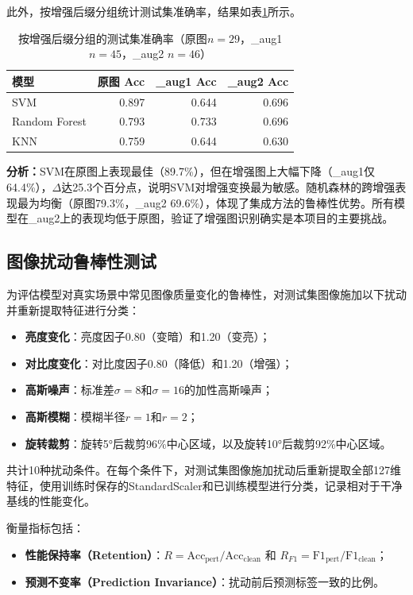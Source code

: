 \documentclass[UTF8,a4paper,12pt]{ctexart}
\numberwithin{figure}{section}
\numberwithin{table}{section}
\begin{document}
此外，按增强后缀分组统计测试集准确率，结果如表\ref{tab:aug_suffix}所示。

\begin{table}[H]
\centering
\caption{按增强后缀分组的测试集准确率（原图$n=29$，\_aug1 $n=45$，\_aug2 $n=46$）}
\label{tab:aug_suffix}
\begin{tabular}{lrrr}
\toprule
\textbf{模型} & \textbf{原图 Acc} & \textbf{\_aug1 Acc} & \textbf{\_aug2 Acc} \\
\midrule
SVM          & 0.897 & 0.644 & 0.696 \\
Random Forest & 0.793 & 0.733 & 0.696 \\
KNN          & 0.759 & 0.644 & 0.630 \\
\bottomrule
\end{tabular}
\end{table}

\textbf{分析：}SVM在原图上表现最佳（89.7\%），但在增强图上大幅下降（\_aug1仅64.4\%），$\Delta$达25.3个百分点，说明SVM对增强变换最为敏感。随机森林的跨增强表现最为均衡（原图79.3\%，\_aug2 69.6\%），体现了集成方法的鲁棒性优势。所有模型在\_aug2上的表现均低于原图，验证了增强图识别确实是本项目的主要挑战。

\subsection{图像扰动鲁棒性测试}

为评估模型对真实场景中常见图像质量变化的鲁棒性，对测试集图像施加以下扰动并重新提取特征进行分类：

\begin{itemize}
    \item \textbf{亮度变化}：亮度因子0.80（变暗）和1.20（变亮）；
    \item \textbf{对比度变化}：对比度因子0.80（降低）和1.20（增强）；
    \item \textbf{高斯噪声}：标准差$\sigma=8$和$\sigma=16$的加性高斯噪声；
    \item \textbf{高斯模糊}：模糊半径$r=1$和$r=2$；
    \item \textbf{旋转裁剪}：旋转5°后裁剪96\%中心区域，以及旋转10°后裁剪92\%中心区域。
\end{itemize}

共计10种扰动条件。在每个条件下，对测试集图像施加扰动后重新提取全部127维特征，使用训练时保存的StandardScaler和已训练模型进行分类，记录相对于干净基线的性能变化。

衡量指标包括：
\begin{itemize}
    \item \textbf{性能保持率（Retention）}：$R = \text{Acc}_{\text{pert}} / \text{Acc}_{\text{clean}}$ 和 $R_{F1} = \text{F1}_{\text{pert}} / \text{F1}_{\text{clean}}$；
    \item \textbf{预测不变率（Prediction Invariance）}：扰动前后预测标签一致的比例。
\end{itemize}
\end{document}
